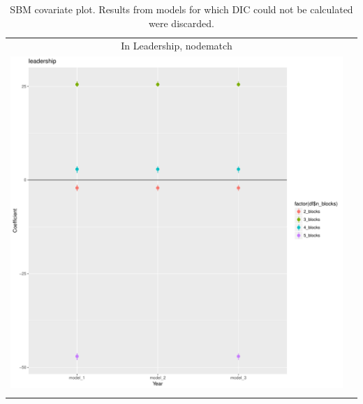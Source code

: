 \documentclass[fleqn,12pt]{wlscirep}
\begin{document}
\clearpage
\begin{longtable}[!h]{c@{\hskip 0cm}c}
In Leadership, nodematch \\
\includegraphics[height=.75\textheight, clip=true, trim=.5cm .5cm 0cm .6cm]{figures/rl_plots1/leadership.pdf}   \\
\caption{\label{fig:SBM_plot_nwsci} SBM covariate plot. Results from models for which DIC could not be calculated were discarded.}
\end{longtable}
\end{document}
